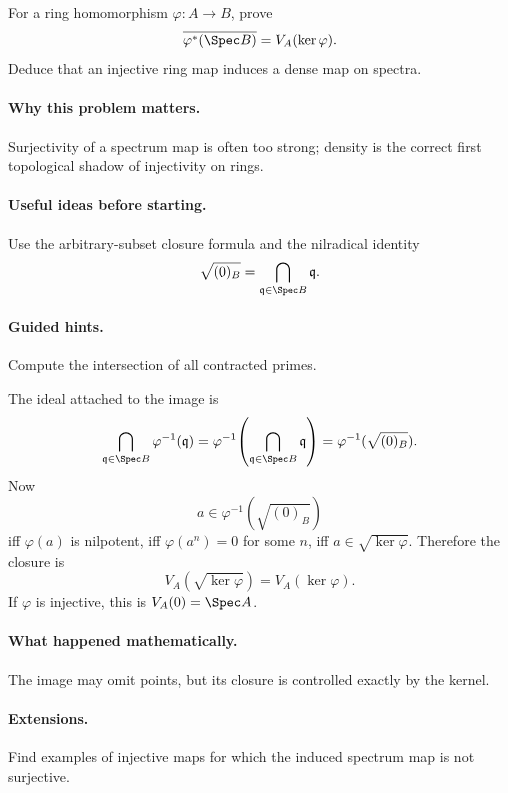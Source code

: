 \begin{problem}
For a ring homomorphism $\varphi:A\to B$, prove
\[
\overline{\varphi^\ast(\Spec B)}
=
V_A(\ker\varphi).
\]
Deduce that an injective ring map induces a dense map on spectra.
\end{problem}

\paragraph{Why this problem matters.}
Surjectivity of a spectrum map is often too strong; density is the correct first topological
shadow of injectivity on rings.

\paragraph{Useful ideas before starting.}
Use the arbitrary-subset closure formula and the nilradical identity
\[
\sqrt{(0)_B}=\bigcap_{\mathfrak q\in\Spec B}\mathfrak q.
\]

\paragraph{Guided hints.}
Compute the intersection of all contracted primes.

\begin{solution}
The ideal attached to the image is
\[
\bigcap_{\mathfrak q\in\Spec B}\varphi^{-1}(\mathfrak q)
=
\varphi^{-1}\!\left(\bigcap_{\mathfrak q\in\Spec B}\mathfrak q\right)
=
\varphi^{-1}(\sqrt{(0)_B}).
\]
Now
\[
a\in\varphi^{-1}(\sqrt{(0)_B})
\]
iff $\varphi(a)$ is nilpotent, iff $\varphi(a^n)=0$ for some $n$, iff
$a\in\sqrt{\ker\varphi}$.  Therefore the closure is
\[
V_A(\sqrt{\ker\varphi})=V_A(\ker\varphi).
\]
If $\varphi$ is injective, this is $V_A(0)=\Spec A$.
\end{solution}

\paragraph{What happened mathematically.}
The image may omit points, but its closure is controlled exactly by the kernel.

\paragraph{Extensions.}
Find examples of injective maps for which the induced spectrum map is not surjective.
